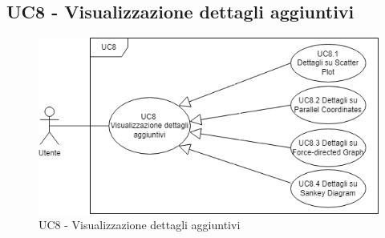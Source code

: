 \subsection{UC8 - Visualizzazione dettagli aggiuntivi}
\label{sec:UC8}
\begin{figure}[h!]
    \centering
    \includegraphics[scale=0.60]{../../assets/visualizzazione_dettagli_aggiuntivi.png}
    \caption{UC8 - Visualizzazione dettagli aggiuntivi}
\end{figure}
